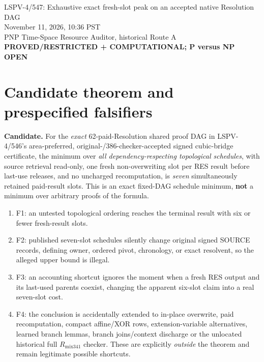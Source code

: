 \documentclass[11pt]{article}
\begin{document}
\begin{center}
{\Large LSPV-4/547: Exhaustive exact fresh-slot peak on an accepted native Resolution DAG}\\[4pt]
November 11, 2026, 10:36 PST\\
PNP Time-Space Resource Auditor, historical Route A\\
\textbf{PROVED/RESTRICTED + COMPUTATIONAL; P versus NP OPEN}
\end{center}

\section*{Candidate theorem and prespecified falsifiers}
\textbf{Candidate.} For the \emph{exact} 62-paid-Resolution shared proof DAG in LSPV-4/546's area-preferred, original-/386-checker-accepted signed cubic-bridge certificate, the minimum over \emph{all dependency-respecting topological schedules}, with source retrieval read-only, one fresh non-overwriting slot per RES result before last-use releases, and no uncharged recomputation, is \emph{seven} simultaneously retained paid-result slots. This is an exact fixed-DAG schedule minimum, \textbf{not} a minimum over arbitrary proofs of the formula.

\begin{enumerate}[label={},leftmargin=0pt,itemindent=0pt]
\item[] F1: an untested topological ordering reaches the terminal result with six or fewer fresh-result slots.
\item[] F2: published seven-slot schedules silently change original signed SOURCE records, defining owner, ordered pivot, chronology, or exact resolvent, so the alleged upper bound is illegal.
\item[] F3: an accounting shortcut ignores the moment when a fresh RES output and its last-used parents coexist, changing the apparent six-slot claim into a real seven-slot cost.
\item[] F4: the conclusion is accidentally extended to in-place overwrite, paid recomputation, compact affine/XOR rows, extension-variable alternatives, learned branch lemmas, branch joins/context discharge or the unlocated historical full $R_{\mathrm{mix341}}$ checker. These are explicitly \emph{outside} the theorem and remain legitimate possible shortcuts.
\end{enumerate}
\end{document}
